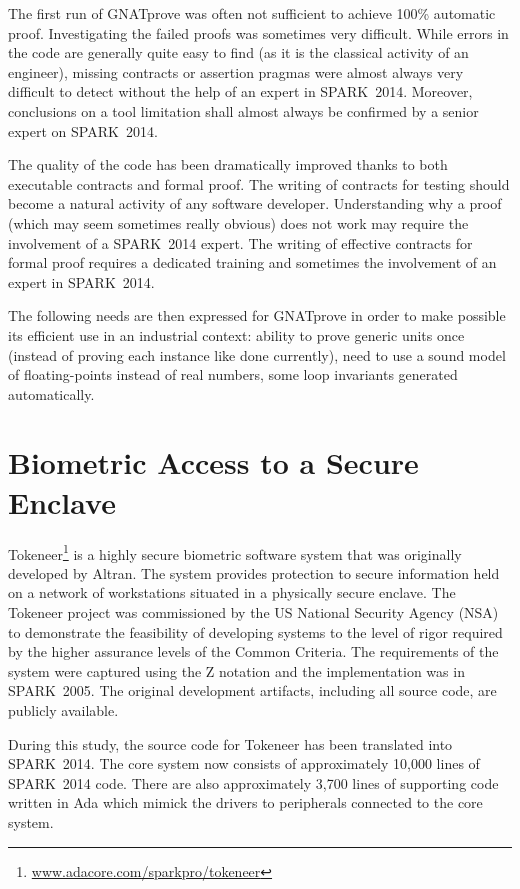 \documentclass[10pt,a4paper,twocolumn]{article}
\newcommand{\gnatprove}{GNATprove\xspace}
\newcommand{\oldspark}{SPARK~2005\xspace}
\newcommand{\newspark}{SPARK~2014\xspace}
\begin{document}
The first run of \gnatprove was often not sufficient to achieve 100\%
automatic proof. Investigating the failed proofs was sometimes very
difficult. While errors in the code are generally quite easy to find
(as it is the classical activity of an engineer), missing contracts or
assertion pragmas were almost always very difficult to detect without
the help of an expert in \newspark. Moreover, conclusions on a tool
limitation shall almost always be confirmed by a senior expert on
\newspark.

The quality of the code has been dramatically improved thanks to both
executable contracts and formal proof. The writing of contracts for
testing should become a natural activity of any software
developer. Understanding why a proof (which may seem sometimes really
obvious) does not work may require the involvement of a \newspark
expert. The writing of effective contracts for formal proof requires a
dedicated training and sometimes the involvement of an expert in
\newspark.

The following needs are then expressed for \gnatprove in order to make
possible its efficient use in an industrial context: ability to prove
generic units once (instead of proving each instance like done
currently), need to use a sound model of floating-points instead of
real numbers, some loop invariants generated automatically.

\section{Biometric Access to a Secure Enclave}
\label{sec:tokeneer}

Tokeneer\footnote{\url{www.adacore.com/sparkpro/tokeneer}} is a highly
secure biometric software system that was originally developed by
Altran. The system provides protection to secure information held on a
network of workstations situated in a physically secure enclave. The
Tokeneer project was commissioned by the US National Security Agency
(NSA) to demonstrate the feasibility of developing systems to the
level of rigor required by the higher assurance levels of the Common
Criteria. The requirements of the system were captured using the Z
notation and the implementation was in \oldspark. The original
development artifacts, including all source code, are publicly
available.

During this study, the source code for Tokeneer has been translated
into \newspark. The core system now consists of approximately 10,000
lines of \newspark code. There are also approximately 3,700 lines of
supporting code written in Ada which mimick the drivers to peripherals
connected to the core system.
\end{document}
